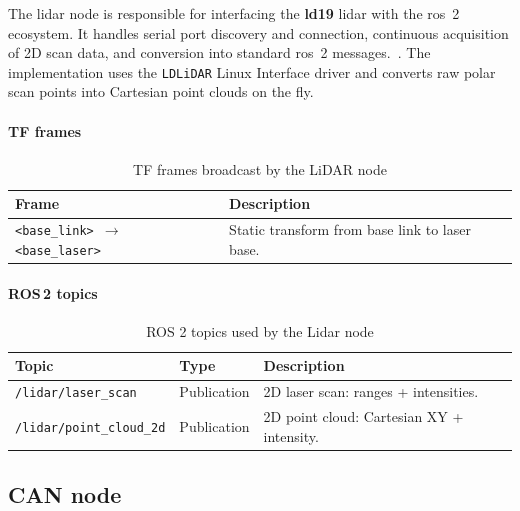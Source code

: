 The \gls{lidar} node is responsible for interfacing the \textbf{ld19} \gls{lidar} with the \gls{ros}~2 ecosystem. It handles serial port discovery and connection, continuous acquisition of 2D scan data, and conversion into standard \gls{ros}~2 messages.~\cite{ldlidar}. The implementation uses the \texttt{LDLiDAR} Linux Interface driver and converts raw polar scan points into Cartesian point clouds on the fly.

\paragraph*{TF frames}

\begin{table}[H]
  \centering
  \begin{tabular}{ll}
    \toprule
    \textbf{Frame}                                    & \textbf{Description}                           \\
    \midrule
    \texttt{<base\_link> $\rightarrow$ <base\_laser>} & Static transform from base link to laser base. \\
    \bottomrule
  \end{tabular}
  \caption{TF frames broadcast by the LiDAR node}
  \label{tab:ldlidar-tf-frames}
\end{table}

\paragraph*{ROS\,2 topics}
\begin{table}[H]
  \centering
  \begin{tabular}{lll}
    \toprule
    \textbf{Topic}                   & \textbf{Type}                             & \textbf{Description} \\
    \midrule
    \texttt{/lidar/laser\_scan}      & Publication
                                     & 2D laser scan: ranges + intensities.                             \\
    \texttt{/lidar/point\_cloud\_2d} & Publication
                                     & 2D point cloud: Cartesian XY + intensity.                        \\
    \bottomrule
  \end{tabular}
  \caption{ROS 2 topics used by the Lidar node}
  \label{tab:ldlidar-topics}
\end{table}


\subsection{CAN node}

